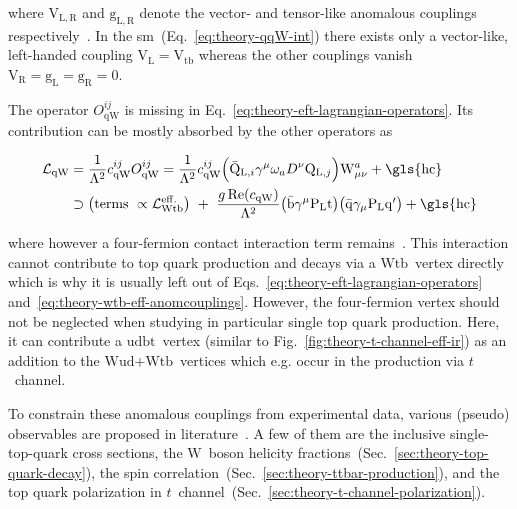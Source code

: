 where $\mathrm{V}_\mathrm{L,R}$ and $\mathrm{g}_\mathrm{L,R}$ denote the vector- and tensor-like anomalous couplings respectively~\cite{AguilarSaavedra:2008zc}. In the \gls{sm}~(Eq.~\ref{eq:theory-qqW-int}) there exists only a vector-like, left-handed coupling $\mathrm{V}_\mathrm{L}=\mathrm{V}_\mathrm{tb}$ whereas the other couplings vanish $\mathrm{V}_\mathrm{R}=\mathrm{g}_\mathrm{L}=\mathrm{g}_\mathrm{R}=0$.

The operator $O_\mathrm{qW}^{ij}$ is missing in Eq.~\ref{eq:theory-eft-lagrangian-operators}. Its contribution can be mostly absorbed by the other operators as

\begin{align}
\mathcal{L}_\mathrm{qW}&=\frac{1}{\Lambda^2}c^{ij}_\mathrm{qW}O_\mathrm{qW}^{ij}=\frac{1}{\Lambda^2}c^{ij}_\mathrm{qW}\Big(\bar{\mathrm{Q}}_{\mathrm{L},i}\gamma^{\mu}\omega_{a}D^\nu\mathrm{Q}_{\mathrm{L},j}\Big)\mathrm{W}_{\mu\nu}^{a}+\mathrm{\gls{hc}}\nonumber\\
&\supset\big(\text{terms }\propto\mathcal{L}_\mathrm{Wtb}^\mathrm{eff.}\big)~+~\frac{g\,\mathrm{Re}(c_\mathrm{qW})}{\Lambda^2}\big(\bar{\mathrm{b}}\gamma^{\mu}\mathrm{P}_\mathrm{L}\mathrm{t}\big)\big(\bar{\mathrm{q}}\gamma_\mu\mathrm{P}_\mathrm{L}\mathrm{q}^\prime\big)+\mathrm{\gls{hc}}\label{eq:theory-wtb-eff-anomcouplings}
\end{align}

where however a four-fermion contact interaction term remains~\cite{Bach:2012fb}. This interaction cannot contribute to top quark production and decays via a $\mathrm{Wtb}$~vertex directly which is why it is usually left out of Eqs.~\ref{eq:theory-eft-lagrangian-operators} and~\ref{eq:theory-wtb-eff-anomcouplings}. However, the four-fermion vertex should not be neglected when studying in particular single top quark production. Here, it can contribute a $\mathrm{udbt}$~vertex (similar to Fig.~\ref{fig:theory-t-channel-eff-ir}) as an addition to the $\mathrm{Wud}\text{+}\mathrm{Wtb}$~vertices which e.g. occur in the production via $t$~channel.

To constrain these anomalous couplings from experimental data, various (pseudo) observables are proposed in literature~\cite{AguilarSaavedra:2010nx,Aguilar-Saavedra:2014eqa}. A few of them are the inclusive single-top-quark cross sections, the $\mathrm{W}$~boson helicity fractions~(Sec.~\ref{sec:theory-top-quark-decay}), the \ttbar spin correlation~(Sec.~\ref{sec:theory-ttbar-production}), and the top quark polarization in $t$~channel~(Sec.~\ref{sec:theory-t-channel-polarization}).




